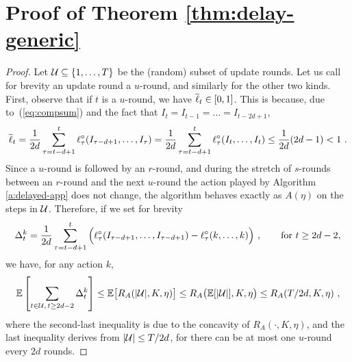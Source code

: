\section{Proof of Theorem \ref{thm:delay-generic}}
%
\begin{proof}
Let $\mathcal{U} \subseteq \{1, \ldots, T\}$ be the (random) subset of update
rounds. Let us call for brevity an update round a $u$-round, and
similarly for the other two kinds. First, observe that if $t$ is a $u$-round,
we have ${\overline{\ell}}_t \in [0,1]$. This is because, due to~(\ref{eq:compsum}) and the fact that $I_t = I_{t-1} = \ldots = I_{t-2d+1}$,
%
\begin{align*}
    {\overline{\ell}}_t
=
    \frac{1}{2d}\sum_{\tau=t-d+1}^t \ell^{\circ}_\tau(I_{\tau-d+1},\dots,I_{\tau})
=
    \frac{1}{2d}\sum_{\tau=t-d+1}^t \ell^{\circ}_\tau(I_{t},\dots,I_{t})
\le
   \frac{1}{2d}(2d-1) < 1~.
\end{align*}
%
%
Since a $u$-round is followed by an $r$-round, and during the stretch of $s$-rounds between an $r$-round
and the next $u$-round the action played by Algorithm \ref{a:delayed-app} does not change, the algorithm
behaves exactly as $A(\eta)$ on the steps in $\mathcal{U}$. Therefore, if we set for brevity
\[
\Delta_t^k = \frac{1}{2d}\sum_{\tau=t-d+1}^t \Big(\ell^{\circ}_\tau(I_{\tau-d+1},\dots,I_{\tau-d+1}) - \ell^{\circ}_\tau(k,\dots,k)\Big)~,
\qquad\text{for $t \geq 2d-2$},
\]
we have, for any action $k$,
%
\begin{equation}
\label{e:upperupdate}
    \mathbb{E}\left[\sum_{t \in \mathcal{U},\, t\geq 2d-2} \Delta_t^k\right]
\le
    \mathbb{E}\big[R_A(|\mathcal{U}|,K,\eta)\big]
\le
    R_A\big(\mathbb{E}[|\mathcal{U}|],K,\eta\big)
\le
    R_A(T/2d,K,\eta)~,
\end{equation}
%
where the second-last inequality is due to the concavity of $R_A(\cdot, K,\eta)$, and
the last inequality derives from $|\mathcal{U}| \leq T/2d$, for there
can be at most one $u$-round every $2d$ rounds.

\end{proof}
